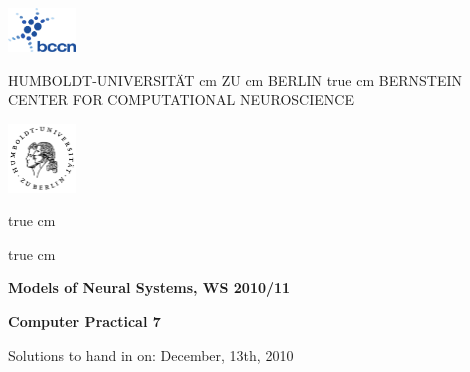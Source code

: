 \documentclass[12pt]{article}
\begin{document}
\parbox{2cm}{
\includegraphics[width=1.8cm]{bccnlogo.pdf}
}
\parbox{11cm}{
\begin{center}
\large HUMBOLDT-UNIVERSIT\"AT  cm ZU  cm BERLIN
 true cm
\mgross BERNSTEIN CENTER FOR COMPUTATIONAL NEUROSCIENCE
\end{center}
}
\parbox{2cm}
{
\hfill
\includegraphics[width=1.8cm]{hublogo.pdf}
}

 true cm



 true cm
\centerline{\bf Models of Neural Systems, WS 2010/11}
\centerline{\bf Computer Practical 7}
\centerline{Solutions to hand in on: December, 13th, 2010}
\end{document}

